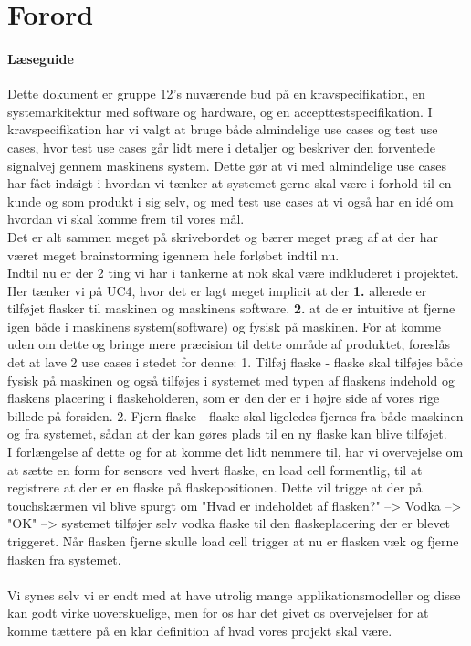 \chapter{Forord}

\subsubsection*{Læseguide}
Dette dokument er gruppe 12's nuværende bud på en kravspecifikation, en systemarkitektur med software og hardware, og en accepttestspecifikation. I kravspecifikation har vi valgt at bruge både almindelige use cases og test use cases, hvor test use cases går lidt mere i detaljer og beskriver den forventede signalvej gennem maskinens system. Dette gør at vi med almindelige use cases har fået indsigt i hvordan vi tænker at systemet gerne skal være i forhold til en kunde og som produkt i sig selv, og med test use cases at vi også har en idé om hvordan vi skal komme frem til vores mål.\\
Det er alt sammen meget på skrivebordet og bærer meget præg af at der har været meget brainstorming igennem hele forløbet indtil nu.\\
Indtil nu er der 2 ting vi har i tankerne at nok skal være indkluderet i projektet. Her tænker vi på UC4, hvor det er lagt meget implicit at der \textbf{1.} allerede er tilføjet flasker til maskinen og maskinens software. \textbf{2.} at de er intuitive at fjerne igen både i maskinens system(software) og fysisk på maskinen. For at komme uden om dette og bringe mere præcision til dette område af produktet, foreslås det at lave 2 use cases i stedet for denne: 1. Tilføj flaske - flaske skal tilføjes både fysisk på maskinen og også tilføjes i systemet med typen af flaskens indehold og flaskens placering i flaskeholderen, som er den der er i højre side af vores rige billede på forsiden. 2. Fjern flaske - flaske skal ligeledes fjernes fra både maskinen og fra systemet, sådan at der kan gøres plads til en ny flaske kan blive tilføjet.\\
I forlængelse af dette og for at komme det lidt nemmere til, har vi overvejelse om at sætte en form for sensors ved hvert flaske, en load cell formentlig, til at registrere at der er en flaske på flaskepositionen. Dette vil trigge at der på touchskærmen vil blive spurgt om "Hvad er indeholdet af flasken?" --> Vodka --> "OK" --> systemet tilføjer selv vodka flaske til den flaskeplacering der er blevet triggeret. Når flasken fjerne skulle load cell trigger at nu er flasken væk og fjerne flasken fra systemet.\\
\\
Vi synes selv vi er endt med at have utrolig mange applikationsmodeller og disse kan godt virke uoverskuelige, men for os har det givet os overvejelser for at komme tættere på en klar definition af hvad vores projekt skal være.